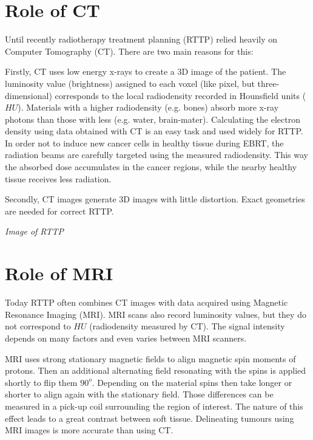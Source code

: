 \documentclass[parskip,bibtotoc,final,twoside=false,titlepage,a4paper,english,12pt,titlepage,a4paper]{scrbook}
\begin{document}
\section{Role of CT}

Until recently radiotherapy treatment planning (RTTP) relied heavily on Computer Tomography (CT). There are two main reasons for this:

Firstly, CT uses low energy x-rays to create a 3D image of the patient. The luminosity value (brightness) assigned to each voxel (like pixel, but three-dimensional) corresponds to
the local radiodensity recorded in Hounsfield units ($HU$). Materials with a higher radiodensity (e.g. bones) absorb more x-ray photons than those with less (e.g. water, brain-mater).
Calculating the electron density using data obtained with CT is an easy task and used widely for RTTP. \cite{Constantinou2012, Schneider1996}
In order not to induce new cancer cells in healthy tissue during EBRT, the radiation beams are carefully targeted using the measured radiodensity. 
This way the absorbed dose accumulates in the cancer regions, while the nearby healthy tissue receives less radiation.

Secondly, CT images generate 3D images with little distortion. Exact geometries are needed for correct RTTP. %

\vspace{4cm}
\textit{Image of RTTP}
\vspace{2cm}

\section{Role of MRI}



Today RTTP often combines CT images with data acquired using Magnetic Resonance Imaging (MRI).
MRI scans also record luminosity values, but they do not correspond to $HU$ (radiodensity measured by CT).
The signal intensity depends on many factors and even varies between MRI scanners.

MRI uses strong stationary magnetic fields to align magnetic spin moments of protons. Then an additional alternating field resonating with the spins is applied shortly to flip them $90^o$.
Depending on the material spins then take longer or shorter to align again with the stationary field. Those differences can be measured in a pick-up coil surrounding the
region of interest. The nature of this effect leads to a great contrast between soft tissue. \cite{Currie2013} Delineating tumours using MRI images is more accurate than using CT.
\cite{Rasch1999, Debois1999a, Roach1996}
\end{document}
